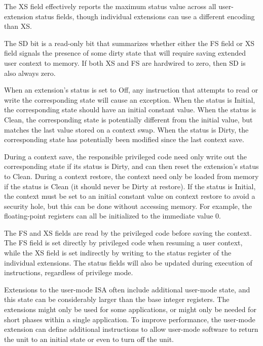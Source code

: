 \begin{commentary}
The XS field effectively reports the maximum status value across all
user-extension status fields, though individual extensions can use a
different encoding than XS.
\end{commentary}

The SD bit is a read-only bit that summarizes whether either the FS
field or XS field signals the presence of some dirty state that will
require saving extended user context to memory.  If both XS and FS are
hardwired to zero, then SD is also always zero.

When an extension's status is set to Off, any instruction that
attempts to read or write the corresponding state will cause an
exception.  When the status is Initial, the corresponding state should
have an initial constant value.  When the status is Clean, the
corresponding state is potentially different from the initial value,
but matches the last value stored on a context swap.  When the status
is Dirty, the corresponding state has potentially been modified since
the last context save.

During a context save, the responsible privileged code need only write
out the corresponding state if its status is Dirty, and can then reset
the extension's status to Clean.  During a context restore, the
context need only be loaded from memory if the status is Clean (it
should never be Dirty at restore).  If the status is Initial, the
context must be set to an initial constant value on context restore to
avoid a security hole, but this can be done without accessing memory.
For example, the floating-point registers can all be initialized to
the immediate value 0.

The FS and XS fields are read by the privileged code before saving the
context.  The FS field is set directly by privileged code when
resuming a user context, while the XS field is set indirectly by
writing to the status register of the individual extensions.  The
status fields will also be updated during execution of instructions,
regardless of privilege mode.

Extensions to the user-mode ISA often include additional user-mode
state, and this state can be considerably larger than the base integer
registers.  The extensions might only be used for some applications,
or might only be needed for short phases within a single application.
To improve performance, the user-mode extension can define additional
instructions to allow user-mode software to return the unit to an
initial state or even to turn off the unit.

